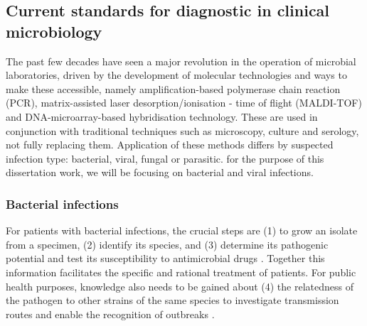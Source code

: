 \subsection{Current standards for diagnostic in clinical microbiology} \label{ssec:current_standards}

The past few decades have seen a major revolution in the operation of microbial laboratories, driven by the development of molecular technologies and ways to make these accessible, namely amplification-based polymerase chain reaction (PCR), matrix-assisted laser desorption/ionisation - time of flight (MALDI-TOF) and DNA-microarray-based hybridisation technology. These are used in conjunction with traditional techniques such as microscopy, culture and serology, not fully replacing them. Application of these methods differs by suspected infection type: bacterial, viral, fungal or parasitic. for the purpose of this dissertation work, we will be focusing on bacterial and viral infections.

\subsubsection{Bacterial infections} \label{sssec:bacterial}

For patients with bacterial infections, the crucial steps are (1) to grow an isolate from a specimen, (2) identify its species, and (3) determine its pathogenic potential and test its susceptibility to antimicrobial drugs  \citep{didelot_transforming_2012}. Together this information facilitates the specific and rational treatment of patients. For public health purposes, knowledge also needs to be gained about (4) the relatedness of the pathogen to other strains of the same species to investigate transmission routes and enable the recognition of outbreaks \citep{foxman_choosing_2005}. 

